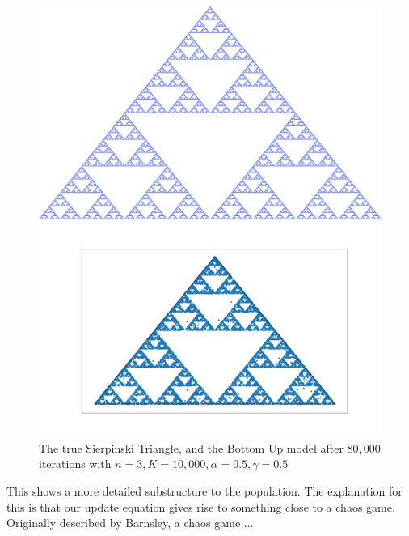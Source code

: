 \begin{figure}[ht]
  \begin{minipage}[t]{0.49\textwidth}
    \includegraphics[width=\textwidth]{Images/Misc/Sierpinski_triangle_real.png}
  \end{minipage}
  \hfill
 \begin{minipage}[t]{0.49\textwidth}
    \includegraphics[width=\textwidth]{Images/Figures/Barycenter/Serpinski_BU.png}
 \end{minipage}
 \caption{ The true Sierpinski Triangle, and the Bottom Up model after $80,000$ iterations with $n=3, K=10,000, \alpha=0.5, \gamma=0.5$   }\label{fig:sierpinski_compare}
\end{figure}


This shows a more detailed substructure to the population. The explanation for this is that our update equation gives rise to something close to a chaos game. Originally described by Barnsley, a chaos game ...

